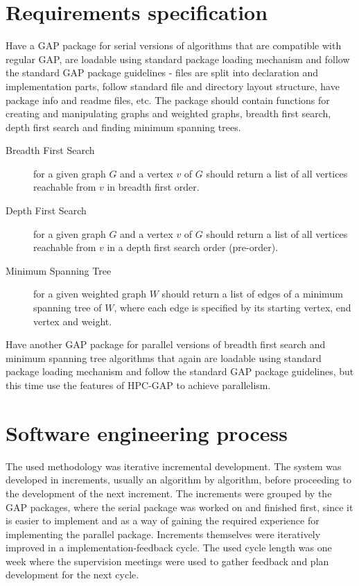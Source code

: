 \documentclass{report}
\theoremstyle{plain}
\theoremstyle{definition}
\theoremstyle{remark}
\begin{document}
\section{Requirements specification}

Have a GAP package for serial versions of algorithms that are compatible with regular GAP, are loadable using standard package loading mechanism and follow the standard GAP package guidelines - files are split into declaration and implementation parts, follow standard file and directory layout structure, have package info and readme files, etc. The package should contain functions for creating and manipulating graphs and weighted graphs, breadth first search, depth first search and finding minimum spanning trees.
\begin{description}
\item[Breadth First Search] for a given graph $G$ and a vertex $v$ of $G$ should return a list of all vertices reachable from $v$ in breadth first order.
\item[Depth First Search] for a given graph $G$ and a vertex $v$ of $G$ should return a list of all vertices reachable from $v$ in a depth first search order (pre-order).
\item[Minimum Spanning Tree] for a given weighted graph $W$ should return a list of edges of a minimum spanning tree of $W$, where each edge is specified by its starting vertex, end vertex and weight.
\end{description}

Have another GAP package for parallel versions of breadth first search and minimum spanning tree algorithms that again are loadable using standard package loading mechanism and follow the standard GAP package guidelines, but this time use the features of HPC-GAP to achieve parallelism.

\section{Software engineering process}
 
The used methodology was iterative incremental development. The system was developed in increments, usually an algorithm by algorithm, before proceeding to the development of the next increment. The increments were grouped by the GAP packages, where the serial package was worked on and finished first, since it is easier to implement and as a way of gaining the required experience for implementing the parallel package. Increments themselves were iteratively improved in a implementation-feedback cycle. The used cycle length was one week where the supervision meetings were used to gather feedback and plan development for the next cycle.
\end{document}
